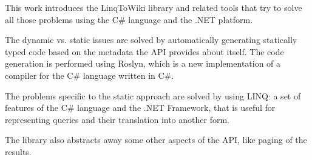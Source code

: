 \medskip

This work introduces the LinqToWiki library and related tools that try to solve all those problems
using the C\# language and the .NET platform.

The dynamic vs. static issues are solved by automatically generating statically typed
code based on the metadata the API provides about itself.
The code generation is performed using Roslyn,
which is a new implementation of a compiler for the C\# language written in C\#.

The problems specific to the static approach are solved by using \ac{LINQ}:
a set of features of the C\# language and the .NET Framework,
that is useful for representing queries and their translation into another form.

The library also abstracts away some other aspects of the \ac{API}, like paging of the results.
